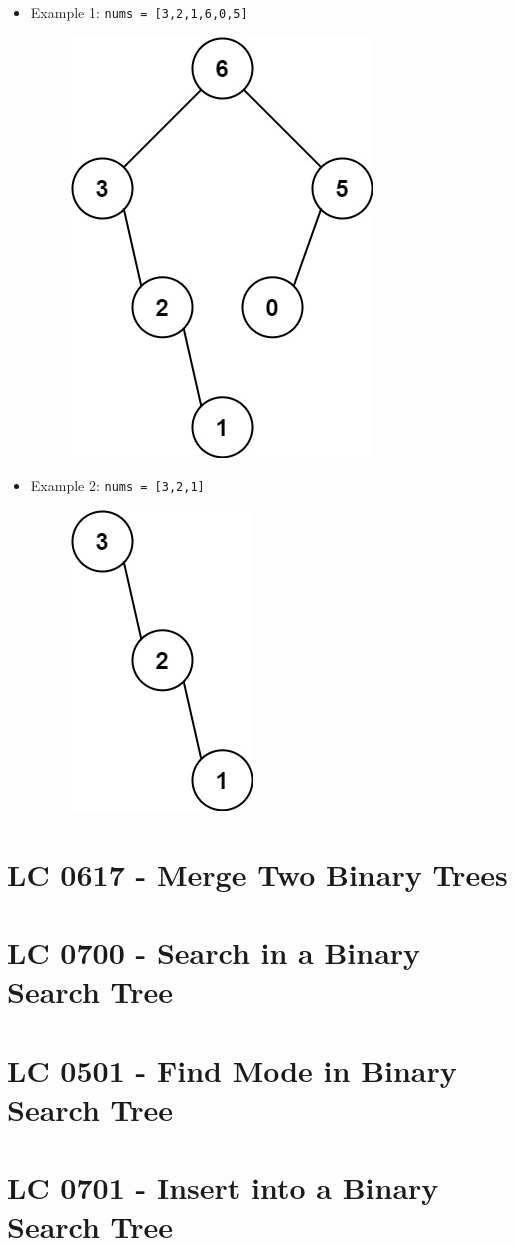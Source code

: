\begin{itemize}
\item Example 1: {\colorbox{CodeBackground}{\lstinline|nums = [3,2,1,6,0,5]|}}
\begin{figure}[H]
\centering
\includegraphics[width=0.25\linewidth]{images/lc0654_eg1}
\label{fig:lc0654eg1}
\end{figure}
\item Example 2: {\colorbox{CodeBackground}{\lstinline|nums = [3,2,1]|}}
\begin{figure}[H]
\centering
\includegraphics[width=0.15\linewidth]{images/lc0654_eg2}
\label{fig:lc0654eg2}
\end{figure}
\end{itemize}

\section{LC 0617 - Merge Two Binary Trees}

\section{LC 0700 - Search in a Binary Search Tree}

\section{LC 0501 - Find Mode in Binary Search Tree}

\section{LC 0701 - Insert into a Binary Search Tree}

